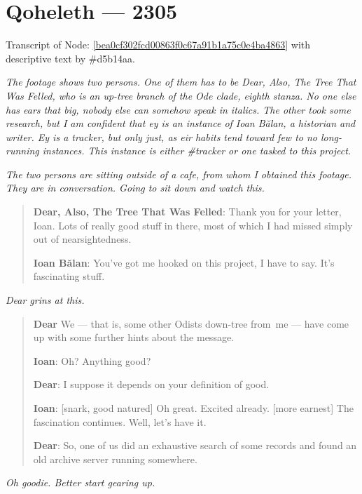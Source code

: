 \hypertarget{qoheleth-2305}{%
\chapter*{Qoheleth — 2305}\label{qoheleth-2305}}

Transcript of Node: \href{http://35.165.134.227/node/bea0cf302fcd00863f0c67a91b1a75c0e4ba4863}{{[}bea0cf302fcd00863f0c67a91b1a75c0e4ba4863{]}} with descriptive text by \#d5b14aa.

\emph{The footage shows two persons. One of them has to be Dear, Also, The Tree That Was Felled, who is an up-tree branch of the Ode clade, eighth stanza. No one else has ears that big, nobody else can somehow speak in italics. The other took some research, but I am confident that ey is an instance of Ioan Bălan, a historian and writer. Ey is a tracker, but only just, as eir habits tend toward few to no long-running instances. This instance is either \#tracker or one tasked to this project.}

\emph{The two persons are sitting outside of a cafe, from whom I obtained this footage. They are in conversation. Going to sit down and watch this.}

\begin{quote}
\textbf{Dear, Also, The Tree That Was Felled}: Thank you for your letter, Ioan. Lots of really good stuff in there, most of which I had missed simply out of nearsightedness.

\textbf{Ioan Bălan}: You've got me hooked on this project, I have to say. It's fascinating stuff.
\end{quote}

\emph{Dear grins at this.}

\begin{quote}
\textbf{Dear} We — that is, some other Odists down-tree from\pagebreak\ me — have come up with some further hints about the message.

\textbf{Ioan}: Oh? Anything good?

\textbf{Dear}: I suppose it depends on your definition of good.

\textbf{Ioan}: {[}snark, good natured{]} Oh great. Excited already. {[}more earnest{]} The fascination continues. Well, let's have it.

\textbf{Dear}: So, one of us did an exhaustive search of some records and found an old archive server running somewhere.
\end{quote}

\emph{Oh goodie. Better start gearing up.}


